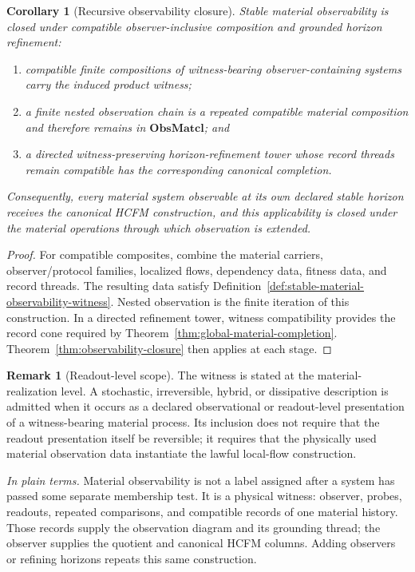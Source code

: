 \documentclass[11pt]{article}
\newtheorem{corollary}{Corollary}
\theoremstyle{definition}
\newtheorem{remark}{Remark}
\newcommand{\ObsMatcl}{\mathbf{ObsMatcl}}
\newcommand{\plainterms}{\emph{In plain terms.}}
\begin{document}
\begin{corollary}[Recursive observability closure]
\label{cor:recursive-observability-closure}
Stable material observability is closed under compatible observer-inclusive
composition and grounded horizon refinement:
\begin{enumerate}[label=(\roman*)]
\item compatible finite compositions of witness-bearing observer-containing
systems carry the induced product witness;
\item a finite nested observation chain is a repeated compatible material
composition and therefore remains in \(\ObsMatcl\); and
\item a directed witness-preserving horizon-refinement tower whose record
threads remain compatible has the corresponding canonical completion.
\end{enumerate}
Consequently, every material system observable at its own declared stable
horizon receives the canonical HCFM construction, and this applicability is
closed under the material operations through which observation is extended.
\end{corollary}

\begin{proof}
For compatible composites, combine the material carriers, observer/protocol
families, localized flows, dependency data, fitness data, and record threads.
The resulting data satisfy
Definition~\ref{def:stable-material-observability-witness}. Nested observation
is the finite iteration of this construction. In a directed refinement tower,
witness compatibility provides the record cone required by
Theorem~\ref{thm:global-material-completion}. Theorem~\ref{thm:observability-closure}
then applies at each stage.
\end{proof}

\begin{remark}[Readout-level scope]
\label{rem:readout-level-scope}
The witness is stated at the material-realization level. A stochastic,
irreversible, hybrid, or dissipative description is admitted when it occurs as
a declared observational or readout-level presentation of a witness-bearing
material process. Its inclusion does not require that the readout presentation
itself be reversible; it requires that the physically used material
observation data instantiate the lawful local-flow construction.
\end{remark}

\noindent\plainterms{} Material observability is not a label assigned after a
system has passed some separate membership test. It is a physical witness:
observer, probes, readouts, repeated comparisons, and compatible records of
one material history. Those records supply the observation diagram and its
grounding thread; the observer supplies the quotient and canonical HCFM
columns. Adding observers or refining horizons repeats this same construction.
\end{document}
